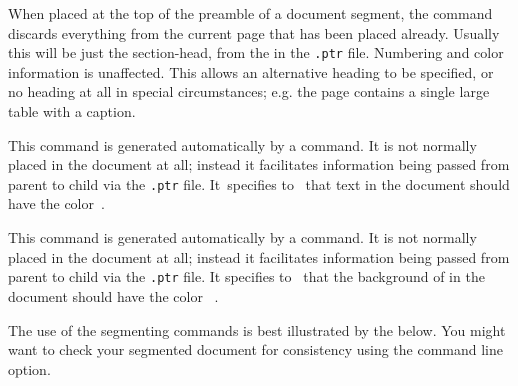 \begin{changebar}
\begin{htmllist}
%
\begin{changebar}
\item [ \Lc{htmlnohead}\label{htmlnohead}] 
%
When placed at the top of the preamble of a document segment, the 
command discards everything from the current page that has been placed already.
Usually this will be just the section-head, from the  
in the \texttt{.ptr} file. Numbering and color information is unaffected.\html{\\}
This allows an alternative heading to be specified, or no heading at all in special
circumstances; e.g. the page contains a single large table with a caption.

%
\item [ \Lc{segmentcolor\char123}\Meta{model}%
 \texttt{\char125\char123}\Meta{color}\texttt{\char125}\label{segcolor}] 
%
This command is generated automatically by a  command. 
It is not normally placed in the document at all; instead it facilitates 
information being passed from parent to child 
via the \texttt{.ptr} file.\html{\\}  
It~specifies to \latextohtml\ that text in the document 
should have the color \,.

%
\item [ \Lc{segmentpagecolor\char123}\Meta{model}%
 \texttt{\char125\char123}\Meta{color}\texttt{\char125}\label{segpagecolor}] 
%
This command is generated automatically by a  command. 
It is not normally placed in the document at all; instead it facilitates 
information being passed from parent to child 
via the \texttt{.ptr} file.\html{\\}
It specifies to \latextohtml\ that the background of in the document 
should have the color ~.%
%
\end{changebar}%
\end{htmllist}\end{changebar}

\begin{changebar}
The use of the segmenting commands is best illustrated by the
 below.
You might want to check your segmented document for consistency using
the  command line option.
\end{changebar}



